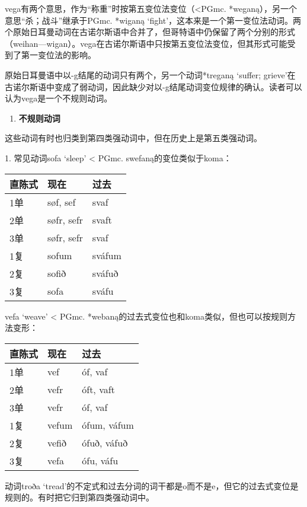 vega有两个意思，作为``称重''时按第五变位法变位（\textless PGmc.
*weganą），另一个意思``杀；战斗''继承于PGmc. *wiganą
`fight'，这本来是一个第一变位法动词。两个原始日耳曼动词在古诺尔斯语中合并了，但哥特语中仍保留了两个分别的形式（weihan---wigan）。vega在古诺尔斯语中只按第五变位法变位，但其形式可能受到了第一变位法的影响。

原始日耳曼语中以-g结尾的动词只有两个，另一个动词*treganą `suffer;
grieve'在古诺尔斯语中变成了弱动词，因此缺少对以-g结尾动词变位规律的确认。读者可以认为vega是一个不规则动词。

\begin{enumerate}
\def\labelenumi{\arabic{enumi})}
\setcounter{enumi}{2}
\item
  \textbf{不规则动词}
\end{enumerate}

这些动词有时也归类到第四类强动词中，但在历史上是第五类强动词。

1. 常见动词sofa `sleep‌' \textless{} PGmc. swefaną的变位类似于koma：

\begin{longtable}{lll}
\toprule
直陈式 & 现在 & 过去 \\
\midrule
\endhead
\bottomrule
\endfoot
1单 & søf, sef & svaf \\
2单 & søfr, sefr & svaft \\
3单 & søfr, sefr & svaf \\
1复 & sofum & sváfum \\
2复 & sofið & sváfuð \\
3复 & sofa & sváfu \\
\end{longtable}

vefa `weave' \textless{} PGmc.
*webaną的过去式变位也和koma类似，但也可以按规则方法变形：

\begin{longtable}{lll}
\toprule
直陈式 & 现在 & 过去 \\
\midrule
\endhead
\bottomrule
\endfoot
1单 & vef & óf, vaf \\
2单 & vefr & óft, vaft \\
3单 & vefr & óf, vaf \\
1复 & vefum & ófum, váfum \\
2复 & vefið & ófuð, váfuð \\
3复 & vefa & ófu, váfu \\
\end{longtable}

动词troða
`tread‌'的不定式和过去分词的词干都是o而不是e，但它的过去式变位是规则的。有时把它归到第四类强动词中。

